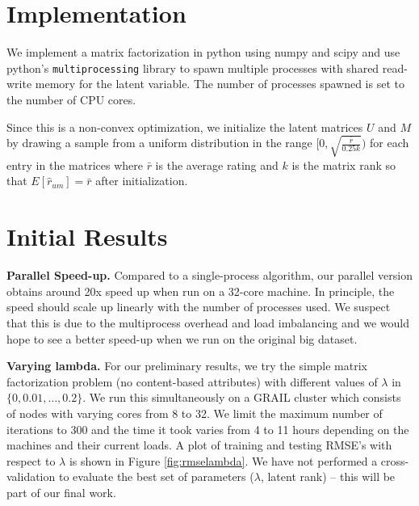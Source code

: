 \documentclass{article} %
\begin{document}
\section{Implementation}

We implement a matrix factorization in python using numpy and scipy and use python's \texttt{multiprocessing} library to spawn multiple processes with shared read-write memory for the latent variable. The number of processes spawned is set to the number of CPU cores.

Since this is a non-convex optimization, we initialize the latent matrices $U$ and $M$ by drawing a sample from a uniform distribution in the range $[0,\sqrt{\frac{\bar{r}}{0.25k}})$ for each entry in the matrices where $\bar{r}$ is the average rating and $k$ is the matrix rank so that $E[\hat{r}_{um}] = \bar{r}$ after initialization.

\section{Initial Results}

\textbf{Parallel Speed-up.}  Compared to a single-process algorithm, our
parallel version obtains around 20x speed up when run on a 32-core machine. In
principle, the speed should scale up linearly with the number of processes
used. We suspect that this is due to the multiprocess overhead and load
imbalancing and we would hope to see a better speed-up when we run on the
original big dataset.

\textbf{Varying lambda.}  For our preliminary results, we try the simple
matrix factorization problem (no content-based attributes) with different
values of $\lambda$ in $\{0, 0.01, \ldots, 0.2\}$. We run this simultaneously
on a GRAIL cluster which consists of nodes with varying cores from 8 to 32. We
limit the maximum number of iterations to 300 and the time it took varies from
4 to 11 hours depending on the machines and their current loads. A plot of
training and testing RMSE's with respect to $\lambda$ is shown in Figure
\ref{fig:rmselambda}. We have not performed a cross-validation to evaluate the
best set of parameters ($\lambda$, latent rank) -- this will be part of our
final work.



\end{document}
